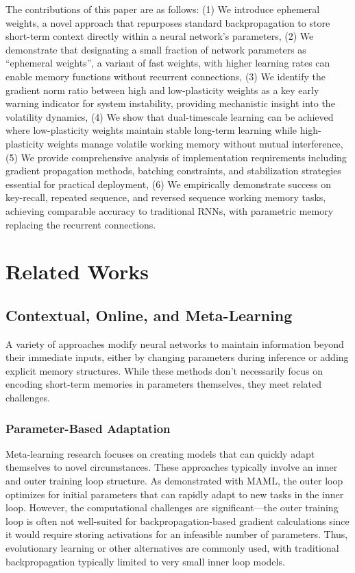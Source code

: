 \documentclass{article} %
\begin{document}
The contributions of this paper are as follows: 
(1) We introduce ephemeral weights, a novel approach that repurposes standard backpropagation to store short-term context directly within a neural network's parameters, 
(2) We demonstrate that designating a small fraction of network parameters as ``ephemeral weights'', a variant of fast weights, with higher learning rates can enable memory functions without recurrent connections, 
(3) We identify the gradient norm ratio between high and low-plasticity weights as a key early warning indicator for system instability, providing mechanistic insight into the volatility dynamics, 
(4) We show that dual-timescale learning can be achieved where low-plasticity weights maintain stable long-term learning while high-plasticity weights manage volatile working memory without mutual interference, 
(5) We provide comprehensive analysis of implementation requirements including gradient propagation methods, batching constraints, and stabilization strategies essential for practical deployment, 
(6) We empirically demonstrate success on key-recall, repeated sequence, and reversed sequence working memory tasks, achieving comparable accuracy to traditional RNNs, with parametric memory replacing the recurrent connections.

\section{Related Works}

\subsection{Contextual, Online, and Meta-Learning}

A variety of approaches modify neural networks to maintain information beyond their immediate inputs, either by changing parameters during inference or adding explicit memory structures. While these methods don't necessarily focus on encoding short-term memories in parameters themselves, they meet related challenges.

\subsubsection{Parameter-Based Adaptation}

Meta-learning research focuses on creating models that can quickly adapt themselves to novel circumstances. These approaches typically involve an inner and outer training loop structure. As \citet{finnModelagnosticMetalearningFast2017} demonstrated with MAML, the outer loop optimizes for initial parameters that can rapidly adapt to new tasks in the inner loop. However, the computational challenges are significant—the outer training loop is often not well-suited for backpropagation-based gradient calculations since it would require storing activations for an infeasible number of parameters. Thus, evolutionary learning or other alternatives are commonly used, with traditional backpropagation typically limited to very small inner loop models.
\end{document}
